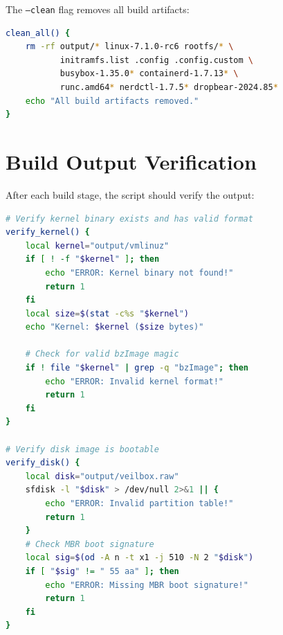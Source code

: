 The \texttt{--clean} flag removes all build artifacts:

\begin{lstlisting}[language=bash]
clean_all() {
    rm -rf output/* linux-7.1.0-rc6 rootfs/* \
           initramfs.list .config .config.custom \
           busybox-1.35.0* containerd-1.7.13* \
           runc.amd64* nerdctl-1.7.5* dropbear-2024.85*
    echo "All build artifacts removed."
}
\end{lstlisting}

\section{Build Output Verification}

After each build stage, the script should verify the output:

\begin{lstlisting}[language=bash]
# Verify kernel binary exists and has valid format
verify_kernel() {
    local kernel="output/vmlinuz"
    if [ ! -f "$kernel" ]; then
        echo "ERROR: Kernel binary not found!"
        return 1
    fi
    local size=$(stat -c%s "$kernel")
    echo "Kernel: $kernel ($size bytes)"

    # Check for valid bzImage magic
    if ! file "$kernel" | grep -q "bzImage"; then
        echo "ERROR: Invalid kernel format!"
        return 1
    fi
}

# Verify disk image is bootable
verify_disk() {
    local disk="output/veilbox.raw"
    sfdisk -l "$disk" > /dev/null 2>&1 || {
        echo "ERROR: Invalid partition table!"
        return 1
    }
    # Check MBR boot signature
    local sig=$(od -A n -t x1 -j 510 -N 2 "$disk")
    if [ "$sig" != " 55 aa" ]; then
        echo "ERROR: Missing MBR boot signature!"
        return 1
    fi
}
\end{lstlisting}
